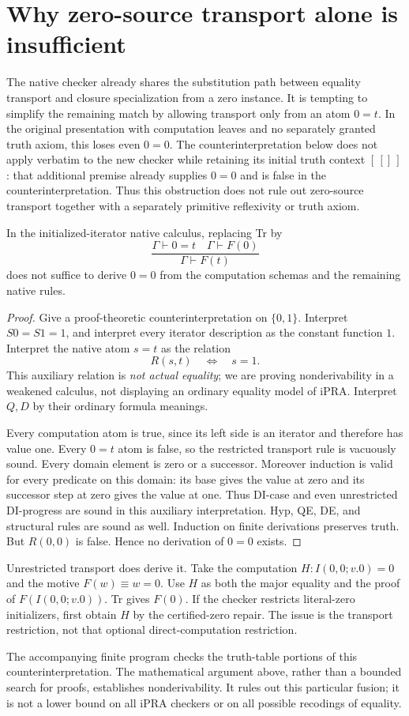 \section{Why zero-source transport alone is insufficient}
\label{sec:zero-obstruction}

The native checker already shares the substitution path between equality
transport and closure specialization from a zero instance. It is tempting
to simplify the remaining match by allowing transport only from an atom
$0=t$. In the original presentation with computation leaves and no
separately granted truth axiom, this loses even $0=0$.
The counterinterpretation below does not apply verbatim to the new
checker while retaining its initial truth context $[\,[]\,]$: that
additional premise already supplies $0=0$ and is false in the
counterinterpretation. Thus this obstruction does not rule out
zero-source transport together with a separately primitive reflexivity
or truth axiom.

\begin{proposition}
In the initialized-iterator native calculus, replacing Tr by
\[
 \frac{\Gamma\vdash0=t\quad\Gamma\vdash F(0)}
      {\Gamma\vdash F(t)}
\]
does not suffice to derive $0=0$ from the computation schemas and the
remaining native rules.
\end{proposition}
\begin{proof}
Give a proof-theoretic counterinterpretation on $\{0,1\}$. Interpret
$S0=S1=1$, and interpret every iterator description as the constant
function $1$. Interpret the native atom $s=t$ as the relation
\[
 R(s,t)\quad\Longleftrightarrow\quad s=1.
\]
This auxiliary relation is \emph{not actual equality}; we are proving
nonderivability in a weakened calculus, not displaying an ordinary
equality model of iPRA. Interpret $Q,D$ by their ordinary formula meanings.

Every computation atom is true, since its left side is an iterator and
therefore has value one. Every $0=t$ atom is false, so the restricted
transport rule is vacuously sound. Every domain element is zero or a
successor. Moreover induction is valid for every predicate on this
domain: its base gives the value at zero and its successor step at zero
gives the value at one. Thus DI-case and even unrestricted DI-progress
are sound in this auxiliary interpretation. Hyp, QE, DE, and structural
rules are sound as well. Induction on finite derivations preserves truth.
But $R(0,0)$ is false. Hence no derivation of $0=0$ exists.
\end{proof}

Unrestricted transport does derive it. Take the computation
$H:I(0,0;v.0)=0$ and the motive $F(w)\equiv w=0$. Use $H$ as both the
major equality and the proof of $F(I(0,0;v.0))$. Tr gives $F(0)$.
If the checker restricts literal-zero initializers, first obtain $H$
by the certified-zero repair. The issue is the transport restriction,
not that optional direct-computation restriction.

The accompanying finite program checks the truth-table portions of this
counterinterpretation. The mathematical argument above, rather than a
bounded search for proofs, establishes nonderivability. It rules out
this particular fusion; it is not a lower bound on all iPRA checkers or
on all possible recodings of equality.
